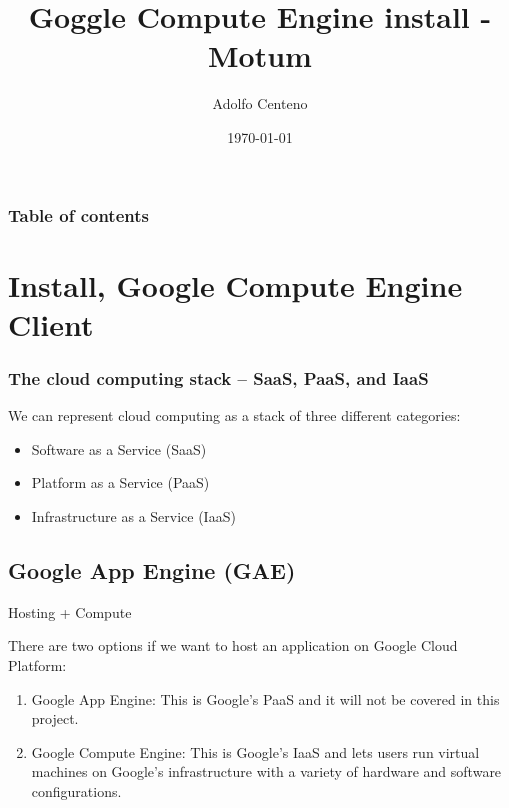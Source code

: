 \documentclass{beamer}
\begin{document}
\title{Goggle Compute Engine install - Motum}  
\author{Adolfo Centeno}
\date{\today} 

\begin{frame}
\titlepage
\end{frame}

\begin{frame}\frametitle{Table of contents}\tableofcontents
\end{frame} 


\section{Install, Google Compute Engine Client} 
\begin{frame}\frametitle{The cloud computing stack – SaaS, PaaS, and IaaS} 

We can represent cloud computing as a stack of three different categories:
\begin{itemize}
\item Software as a Service (SaaS)   
\item Platform as a Service (PaaS) 
\item Infrastructure as a Service (IaaS)
 

\end{itemize} 



\end{frame}

\subsection{Google App Engine (GAE)}
\begin{frame} 

Hosting + Compute 

There are two options if we want to host an application on Google Cloud Platform:



\begin{enumerate}

\item
Google App Engine: This is Google's PaaS and it will not be covered in this project.

\item
Google Compute Engine: This is Google's IaaS and lets users run virtual
machines on Google's infrastructure with a variety of hardware and
software configurations.
\end{enumerate}

\end{frame}
\end{document}
